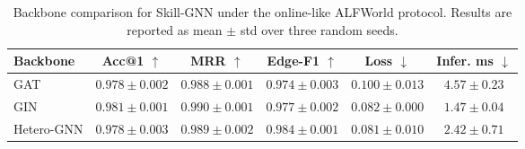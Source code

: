 \begin{table}[t]
\centering
\small
\caption{Backbone comparison for Skill-GNN under the online-like ALFWorld protocol. Results are reported as mean $\pm$ std over three random seeds.}
\label{tab:gnn_backbone}
\begin{tabular}{lccccc}
\toprule
Backbone 
& Acc@1 $\uparrow$ 
& MRR $\uparrow$ 
& Edge-F1 $\uparrow$ 
& Loss $\downarrow$ 
& Infer. ms $\downarrow$ \\
\midrule
GAT 
& $0.978 \pm 0.002$ 
& $0.988 \pm 0.001$ 
& $0.974 \pm 0.003$ 
& $0.100 \pm 0.013$ 
& $4.57 \pm 0.23$ \\

GIN 
& $\mathbf{0.981 \pm 0.001}$ 
& $\mathbf{0.990 \pm 0.001}$ 
& $0.977 \pm 0.002$ 
& $0.082 \pm 0.000$ 
& $\mathbf{1.47 \pm 0.04}$ \\

Hetero-GNN 
& $0.978 \pm 0.003$ 
& $0.989 \pm 0.002$ 
& $\mathbf{0.984 \pm 0.001}$ 
& $\mathbf{0.081 \pm 0.010}$ 
& $2.42 \pm 0.71$ \\
\bottomrule
\end{tabular}
\end{table}